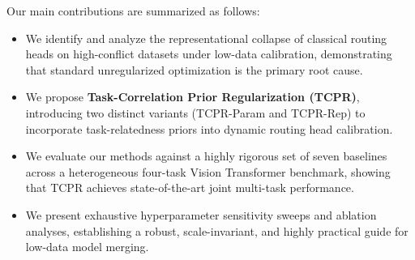 Our main contributions are summarized as follows:
\begin{itemize}
    \item We identify and analyze the representational collapse of classical routing heads on high-conflict datasets under low-data calibration, demonstrating that standard unregularized optimization is the primary root cause.
    \item We propose \textbf{Task-Correlation Prior Regularization (TCPR)}, introducing two distinct variants (TCPR-Param and TCPR-Rep) to incorporate task-relatedness priors into dynamic routing head calibration.
    \item We evaluate our methods against a highly rigorous set of seven baselines across a heterogeneous four-task Vision Transformer benchmark, showing that TCPR achieves state-of-the-art joint multi-task performance.
    \item We present exhaustive hyperparameter sensitivity sweeps and ablation analyses, establishing a robust, scale-invariant, and highly practical guide for low-data model merging.
\end{itemize}
